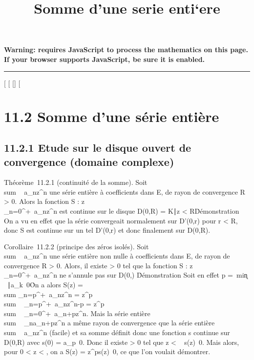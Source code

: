 \documentclass[]{article}
\title{Somme d'une serie enti`ere}
\author{}
\date{}
\begin{document}
\maketitle

\textbf{Warning: 
requires JavaScript to process the mathematics on this page.\\ If your
browser supports JavaScript, be sure it is enabled.}

\begin{center}\rule{3in}{0.4pt}\end{center}

[
[
[]
[

\section{11.2 Somme d'une série entière}

\subsection{11.2.1 Etude sur le disque ouvert de convergence (domaine
complexe)}

Théorème~11.2.1 (continuité de la somme). Soit
\\sum ~
a_nz^n une série entière à coefficients dans E, de
rayon de convergence R > 0. Alors la fonction S :
z\mapsto~\\\sum
 _n=0^+\infty~a_nz^n est continue sur le
disque D(0,R) = \z \in
K∣z <
R\.

Démonstration On a vu en effet que la série convergeait normalement sur
D'(0,r) pour r < R, donc S est continue sur un tel D'(0,r) et
donc finalement sur D(0,R).

Corollaire~11.2.2 (principe des zéros isolés). Soit
\\sum ~
a_nz^n une série entière non nulle à coefficients
dans E, de rayon de convergence R > 0. Alors, il existe \eta
> 0 tel que la fonction S :
z\mapsto~\\\sum
 _n=0^+\infty~a_nz^n ne s'annule pas sur
D(0,\eta) \diagdown\0\.

Démonstration Soit en effet p =\
min\k \in
{}~∣a_k\mathrel\neq~0\.
On a alors S(z) =\ \\sum
 _n=p^+\infty~a_nz^n =
z^p \\sum ~
_n=p^+\infty~a_nz^n-p =
z^p \\sum ~
_n=0^+\infty~a_n+pz^n. Mais la série entière
\\sum ~
_na_n+pz^n a même rayon de convergence que la
série entière \\sum ~
a_nz^n (facile) et sa somme définit donc une
fonction s continue sur D(0,R) avec s(0) =
a_p\neq~0. Donc il existe \eta
> 0 tel que z < \eta \rigtharrow~
s(z)\neq~0. Mais alors, pour 0 <
z < \eta, on a S(z) =
z^ps(z)\neq~0, ce que l'on voulait
démontrer.
\end{document}
